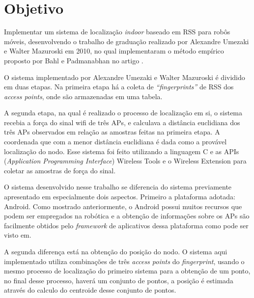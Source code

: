 \clearpage
\section{Objetivo}
	Implementar um sistema de localização \textit{indoor} baseado em RSS para robôs móveis,
	desenvolvendo o trabalho de graduação realizado por 
  Alexandre Umezaki e Walter Mazuroski em 2010, no qual implementaram o método empírico proposto
  por Bahl e Padmanabhan no artigo \cite{wifiRadar}.
  
  O sistema implementado por Alexandre Umezaki e Walter Mazuroski é dividido em duas etapas. 
  Na primeira etapa há a coleta de \textit{``fingerprints''} de RSS dos \textit{access points}, onde são armazenadas em
  uma tabela.%
  
  A segunda etapa, na qual é realizado o processo de localização 
  em si, o sistema recebia a força do sinal wifi de três APs, e calculava a distância euclidiana dos 
  três APs observados em relação as amostras feitas na primeira etapa. A coordenada 
  que com a menor distância euclidiana é dada como a provável localização do nodo. 
  Esse sistema foi feito utilizando a linguagem C
  e as APIs (\textit{Application Programming Interface}) Wireless Tools e o Wireless Extension\cite{apic}
 para coletar as amostras de força do sinal.
  
  O sistema desenvolvido nesse trabalho se diferencia do sistema previamente apresentado em
  especialmente dois aspectos. Primeiro a plataforma adotada: Android. Como mostrado anteriormente,
  o Android possui muitos recursos que podem ser empregados na robótica e a obtenção de informações 
  sobre os APs são facilmente obtidos pelo \textit{framework} de aplicativos dessa plataforma como
  pode ser visto em\cite{getRss}.
  
  A segunda diferença está na obtenção do posição do nodo. O sistema aqui implementado utiliza 
  combinações de três \textit{access points} do \textit{fingerprint}, usando o mesmo 
  processo de localização do primeiro sistema para a obtenção de um ponto, no final desse processo, haverá 
  um conjunto de pontos, a posição é estimada através do calculo do centroide desse conjunto de pontos.
   
